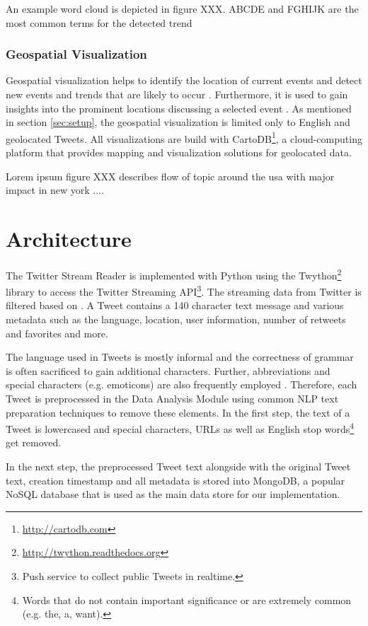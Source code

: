 
An example word cloud is depicted in figure XXX. ABCDE and FGHIJK are the most common terms for the detected trend

\subsubsection{Geospatial Visualization}
\label{subsubsection:vis-geospatial}
Geospatial visualization helps to identify the location of current events and detect new events and trends that are likely to occur \cite{TwitterDataAnalytics2013}. Furthermore, it is used to gain insights into the prominent locations discussing a selected event \cite[64-66]{TwitterDataAnalytics2013}. As mentioned in section \ref{sec:setup}, the geospatial visualization is limited only to English and geolocated Tweets. All visualizations are build with CartoDB\footnote{\url{http://cartodb.com} \accessednote}, a cloud-computing platform that provides mapping and visualization solutions for geolocated data. 


Lorem ipsum figure XXX describes flow of topic around the usa with major impact in new york ....


\section{Architecture}
\label{sec:architecture}
The Twitter Stream Reader is implemented with Python using the Twython\footnote{\url{http://twython.readthedocs.org} \accessednote} library to access the Twitter Streaming API\footnote{Push service to collect public Tweets in realtime.}. The streaming data from Twitter is filtered based on . A Tweet contains a 140 character text message and various metadata such as the language, location, user information, number of retweets and favorites and more. 

The language used in Tweets is mostly informal and the correctness of grammar is often sacrificed to gain additional characters. Further, abbreviations and special characters (e.g. emoticons) are also frequently employed \cite[67]{TwitterDataAnalytics2013}. Therefore, each Tweet is preprocessed in the Data Analysis Module using common NLP text preparation techniques to remove these elements. In the first step, the text of a Tweet is lowercased and special characters, URLs as well as English stop words\footnote{Words that do not contain important significance or are extremely common (e.g. the, a, want).} get removed.

In the next step, the preprocessed Tweet text alongside with the original Tweet text, creation timestamp and all metadata is stored into MongoDB, a popular NoSQL database that is used as the main data store for our implementation.
